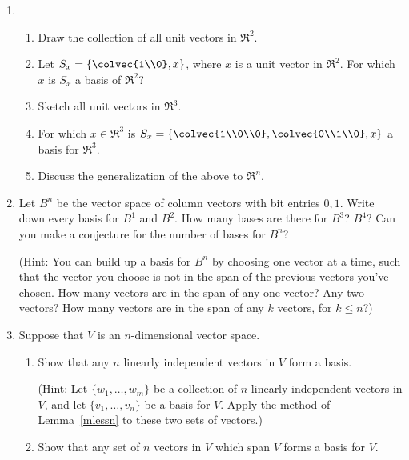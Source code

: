 


\begin{enumerate}
\item \begin{enumerate}
\item Draw the collection of all unit vectors in $\Re^2$. 
\item  Let $S_x=\left\{ \colvec{1\\0}, x \right\}$, where $x$ is a unit vector in $\Re^2$.  For which $x$ is $S_x$ a basis of $\Re^2$?
\item Sketch all unit vectors in $\Re^3$.
\item For which $x\in \Re^3$ is $S_x=\left\{ \colvec{1\\0\\0},\colvec{0\\1\\0}, x \right\}$ a basis for $\Re^3$.  
\item Discuss the generalization of the above to $\Re^n$.
\end{enumerate}


\item \label{prob_bit_matrices_basis} Let $B^n$ be the vector space of column vectors with bit entries $0, 1$.  Write down every basis for $B^1$ and $B^2$.  How many bases are there for $B^3$? $B^4$?  Can you make a conjecture for the number of bases for $B^n$?

(Hint: You can build up a basis for $B^n$ by choosing one vector at a time, such that the vector you choose is not in the span of the previous vectors you've chosen.  How many vectors are in the span of any one vector?  Any two vectors?  How many vectors are in the span of any $k$ vectors, 
for $k\leq n$?)



\item \label{lotsofbases} Suppose that \(V\) is an \(n\)-dimensional vector space.
\begin{enumerate}
\item Show that any \(n\) linearly independent vectors in \(V\) form a basis.

(Hint: Let \(\{w_1, \ldots, w_m\}\) be a collection of \(n\) linearly independent vectors in \(V\), and let \(\{v_1, \ldots, v_n\}\) be a basis for \(V\). Apply the method of Lemma~\ref{mlessn} to these two sets of vectors.)
\item Show that any set of \(n\) vectors in \(V\) which span \(V\) forms a basis for \(V\).


\end{enumerate}
\end{enumerate}
